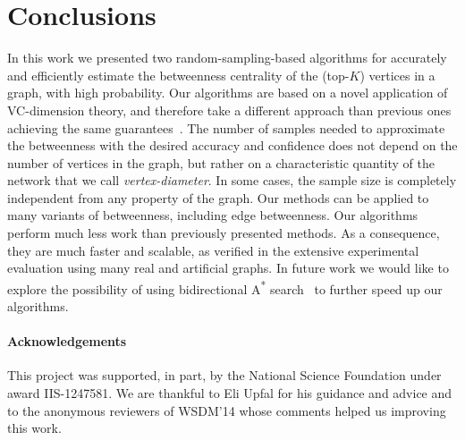 \section{Conclusions}\label{sec:concl}
In this work we presented two random-sampling-based algorithms for accurately and
efficiently estimate the betweenness centrality of the (top-$K$) vertices in a
graph, with high probability.
Our algorithms are based on a novel application of VC-dimension theory, and
therefore take a different approach than previous ones achieving the same
guarantees~\citep{BrandesP07,GeisbergerSS08,JacobKLPT05}. The number of samples
needed to approximate the betweenness with the desired accuracy and confidence
does not depend on the number of vertices in the graph, but rather on a
characteristic quantity of the network that we call
\emph{vertex-diameter}. In some cases, the sample size is completely
independent from any property of the graph. %
\ifproof
Our methods can be applied to many variants of betweenness, including edge
betweenness. %
\fi
Our algorithms perform much less work than previously presented methods. %
As a consequence, they are much faster and
scalable, as verified in the extensive experimental
evaluation using many real and artificial graphs. 
\ifdmkd
\else
In future work we would like
to explore the possibility of using bidirectional A\textsuperscript{*}
search~\citep{Pohl69,KaindlK97} to further speed up our algorithms.  
\fi

\ifdmkd
\else
\paragraph*{Acknowledgements} This project was supported, in part, by the
National Science Foundation under award IIS-1247581. We are thankful to Eli
Upfal for his guidance and advice and to the anonymous reviewers of WSDM'14
whose comments helped us improving this work.
\fi

